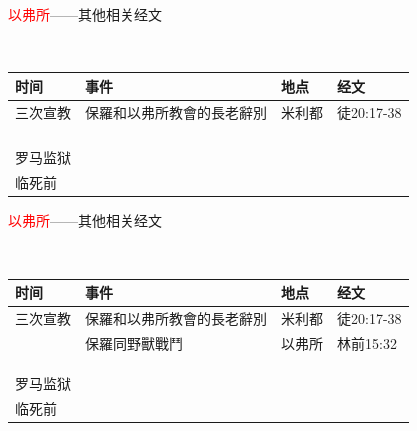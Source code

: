 \documentclass{beamer}
\begin{document}
\begin{frame}{\textcolor{red}{以弗所}——其他相关经文}
\begin{block}{}\\
\begin{table}
\hspace{-1.cm}
\begin{tabular}{l|l|l|l}
时间 & 事件 &地点&经文\\\hline\hline
三次宣教&保羅和以弗所教會的長老辭別&米利都&徒20:17-38\\
&&&\\
&&& \\
&&& \\
&&&\\\hline\hline
罗马监狱&&&\\\hline\hline
临死前&&&\\\hline\hline
\end{tabular}
\end{table}
\end{block}
\end{frame}


\begin{frame}{\textcolor{red}{以弗所}——其他相关经文}
\begin{block}{}\\
\begin{table}
\hspace{-1.cm}
\begin{tabular}{l|l|l|l}
时间 & 事件 &地点&经文\\\hline\hline
三次宣教&保羅和以弗所教會的長老辭別&米利都&徒20:17-38\\
&保羅同野獸戰鬥&以弗所&林前15:32\\
&&& \\
&&& \\
&&&\\\hline\hline
罗马监狱&&&\\\hline\hline
临死前&&&\\\hline\hline
\end{tabular}
\end{table}
\end{block}
\end{frame}
\end{document}
